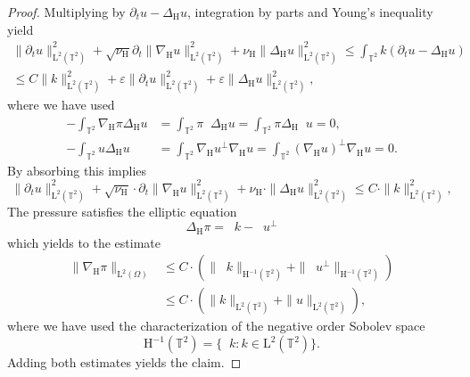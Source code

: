 \documentclass[10pt,a4paper]{amsart}
\newcommand{\DeltaH}{\Delta_{\H}}
\renewcommand{\H}{\mathrm{H}}
\newcommand {\T}	{\mathbb{T}}
\DeclareMathOperator{\divH}{div_{\H}}
\newcommand{\nablaH}{\nabla_{\H}}
\newcommand{\rH}{\H}
\newcommand{\rL}{\mathrm{L}}
\begin{document}
\begin{proof}
	Multiplying by $\partial_t u - \DeltaH u$, integration by parts and Young's inequality yield
	\begin{align*}
		\| \partial_t u \|_{\rL^2(\T^2)}^2 
		+
		\sqrt{\nu_{\rH}}\partial_t \| \nablaH u \|_{\rL^2(\T^2)}^2
		+\nu_{\rH} \|\DeltaH u \|_{\rL^2(\T^2)}^2
		\leq \int_{\T^2} k (\partial_t u - \DeltaH u) \\
		\leq 
		C \| k \|_{\rL^2(\T^2)}^2
		+
		\varepsilon \| \partial_t u \|_{\rL^2(\T^2)}^2 
		+
		\varepsilon 
		\|\DeltaH u \|_{\rL^2(\T^2)}^2
		, 
	\end{align*}
	where we have used 
	\begin{align*}
		-\int_{\T^2} \nablaH \pi \DeltaH u
		&=  \int_{\T^2} \pi \divH \DeltaH u
		= \int_{\T^2} \pi \DeltaH \divH u
		= 0, \\
		-\int_{\T^2} u \DeltaH u 
		&= \int_{\T^2} \nablaH  u^\perp \nablaH u
		= \int_{\T^2} (\nablaH  u)^\perp \nablaH u
		= 0 . 
	\end{align*}
	By absorbing this implies 
	\begin{equation*}
		\| \partial_t u \|_{\rL^2(\T^2)}^2 
		+
		\sqrt{\nu_{\rH}}\cdot \partial_t \| \nablaH u \|_{\rL^2(\T^2)}^2
		+ \nu_{\rH}\cdot \|\DeltaH u \|_{\rL^2(\T^2)}^2
		\leq 
		C \cdot \| k \|_{\rL^2(\T^2)}^2
		, 
	\end{equation*}
	The pressure satisfies the elliptic equation
	\begin{equation*}
		\DeltaH \pi = \divH k - \divH u^\perp  
	\end{equation*}
	which yields to the estimate
	\begin{align*}
		\| \nablaH \pi \|_{\rL^2(\Omega)}
		&\leq C \cdot (\| \divH k \|_{\rH^{-1}(\T^2)}
		+ \| \divH u^\perp \|_{\rH^{-1}(\T^2)}) \\
		&\leq C \cdot (\| k \|_{\rL^2(\T^2)}
		+ \| u \|_{\rL^2(\T^2)}) ,
	\end{align*}
	where we have used the characterization of the negative order Sobolev space
	\begin{equation*}
		\rH^{-1}(\T^2) = \{ \divH k \colon k \in \rL^2(\T^2) \} .
	\end{equation*}
	Adding both estimates yields the claim. 
\end{proof}
\end{document}
